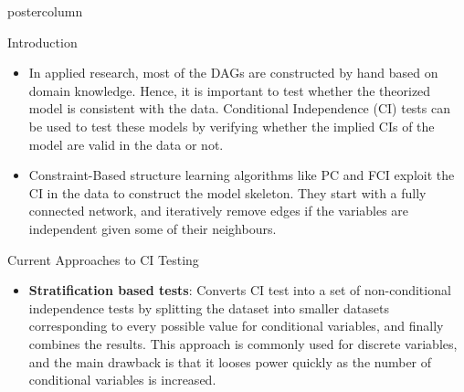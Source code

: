 \documentclass{beamer}
\def\ci{\perp\!\!\!\!\!\perp}
\begin{document}
\begin{frame}
\begin{columns}
\begin{column}{.33\textwidth}
\begin{beamercolorbox}[center]{postercolumn}
\begin{minipage}{.98\textwidth}
{\begin{myblock}{Introduction}
	\begin{itemize}
		\item In applied research, most of the DAGs are constructed by
			hand based on domain knowledge. Hence, it is important
			to test whether the theorized model is consistent with
			the data. Conditional Independence (CI) tests can be
			used to test these models by verifying whether the
			implied CIs of the model are valid in the data or not.
		\item Constraint-Based structure learning algorithms like PC and FCI exploit
			the CI in the data to construct the model skeleton. They start with
			a fully connected network, and iteratively remove edges if the variables 
			are independent given some of their neighbours.
	\end{itemize}

					\end{myblock}\vfill
					\begin{myblock}{Current Approaches to CI Testing}
						\begin{itemize}
							\item \textbf{Stratification based tests}: Converts CI
								test into a set of non-conditional independence tests
								by splitting the dataset into smaller datasets corresponding to
								every possible value for conditional variables, and finally combines 
								the results. This approach is commonly used for discrete variables, and
								the main drawback is that it looses power quickly as the number of conditional variables
								is increased.


\end{itemize}
\end{myblock}}
\end{minipage}
\end{beamercolorbox}
\end{column}
\end{columns}
\end{frame}
\end{document}
